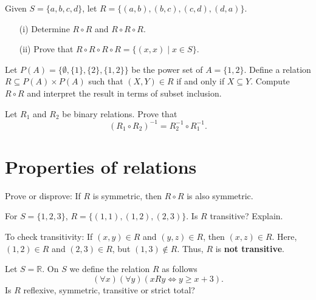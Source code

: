\documentclass[11pt,paper=b5,footinclude,headinclude]{scrbook} %
\theoremstyle{remark}
\theoremstyle{definition} %
\theoremstyle{theorem} %
\newtheorem{ex}{Exercise\hypertarget{sol:\theex}}[chapter]
\begin{document}
\begin{ex}
Given \(S = \{a, b, c, d\}\), let \(R = \{(a, b), (b, c), (c, d), (d, a)\}\).
\begin{itemize}
    \item[(i)] Determine \(R \circ R\) and \(R \circ R \circ R\).
    \item[(ii)] Prove that \(R \circ R \circ R \circ R = \{(x, x) \mid x \in S\}\).
\end{itemize}
\end{ex}

\begin{ex}\label{ex:powerset2}
Let \(P(A) = \{\emptyset, \{1\}, \{2\}, \{1, 2\}\}\) be the power set of \(A = \{1, 2\}\). Define a relation \(R \subseteq P(A) \times P(A)\) such that \((X, Y) \in R\) if and only if \(X \subseteq Y\).
 Compute \(R \circ R\) and interpret the result in terms of subset inclusion.
\end{ex}


\begin{ex}
Let \(R_1\) and \(R_2\) be binary relations. Prove that 
$$(R_1\circ R_2)^{-1}=R_2^{-1}\circ R_1^{-1}.$$
\end{ex}



\section{Properties of relations}
\begin{ex}
    Prove or disprove: If \(R\) is symmetric, then \(R \circ R\) is also symmetric.
\end{ex}
\begin{ex}
    For \(S = \{1, 2, 3\}\), \(R = \{(1, 1), (1, 2), (2, 3)\}\). Is \(R\) transitive? Explain.
    \begin{sol}
        To check transitivity:  
If \((x, y) \in R\) and \((y, z) \in R\), then \((x, z) \in R\).  
Here, \((1, 2) \in R\) and \((2, 3) \in R\), but \((1, 3) \notin R\).  
Thus, \(R\) is \textbf{not transitive}.

    \end{sol}
\end{ex}
\begin{ex}
Let  $S= \mathbb{R}$. On $S$ we define the relation $R$ as follows
$$(\forall x)(\forall y)(x R y \Leftrightarrow y \geq x +3).$$
Is $R$ reflexive, symmetric, transitive or strict total?

   \end{ex}
 
\end{document}
